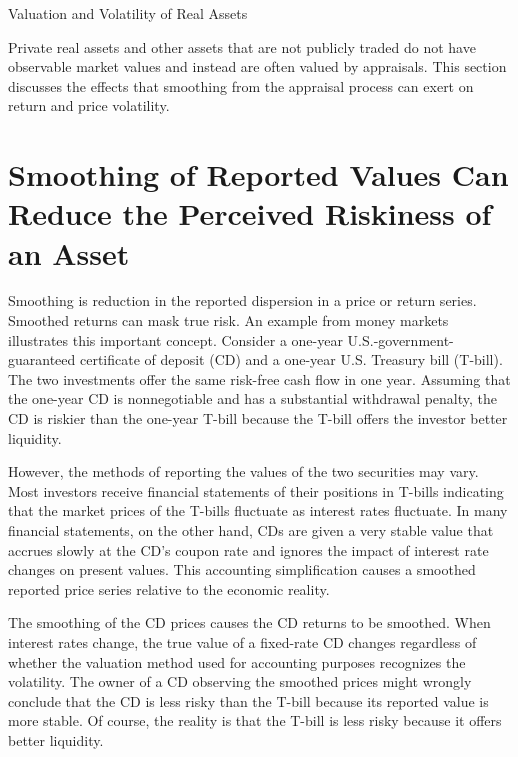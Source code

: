 \documentclass[11pt]{article}
\begin{document}
Valuation and Volatility of Real Assets

Private real assets and other assets that are not publicly traded do not have observable market values and instead are often valued by appraisals. This section discusses the effects that smoothing from the appraisal process can exert on return and price volatility.

\section*{Smoothing of Reported Values Can Reduce the Perceived Riskiness of an Asset}
Smoothing is reduction in the reported dispersion in a price or return series. Smoothed returns can mask true risk. An example from money markets illustrates this important concept. Consider a one-year U.S.-government-guaranteed certificate of deposit (CD) and a one-year U.S. Treasury bill (T-bill). The two investments offer the same risk-free cash flow in one year. Assuming that the one-year CD is nonnegotiable and has a substantial withdrawal penalty, the CD is riskier than the one-year T-bill because the T-bill offers the investor better liquidity.

However, the methods of reporting the values of the two securities may vary. Most investors receive financial statements of their positions in T-bills indicating that the market prices of the T-bills fluctuate as interest rates fluctuate. In many financial statements, on the other hand, CDs are given a very stable value that accrues slowly at the CD's coupon rate and ignores the impact of interest rate changes on present values. This accounting simplification causes a smoothed reported price series relative to the economic reality.

The smoothing of the CD prices causes the CD returns to be smoothed. When interest rates change, the true value of a fixed-rate CD changes regardless of whether the valuation method used for accounting purposes recognizes the volatility. The owner of a CD observing the smoothed prices might wrongly conclude that the CD is less risky than the T-bill because its reported value is more stable. Of course, the reality is that the T-bill is less risky because it offers better liquidity.
\end{document}
